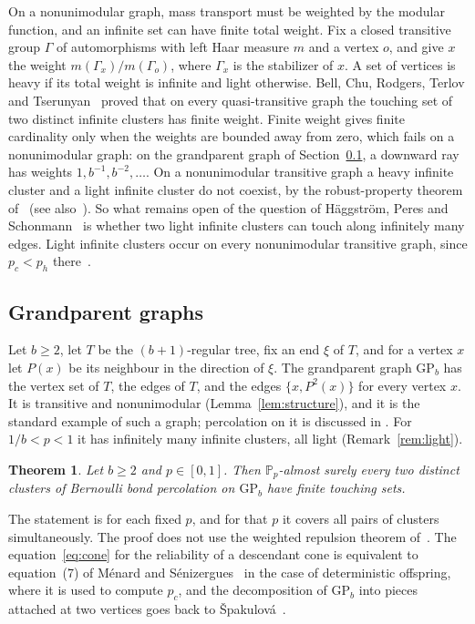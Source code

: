 \documentclass[11pt]{amsart}
\newtheorem{theorem}{Theorem}[section]
\theoremstyle{remark}
\newcommand{\PP}{\mathbb{P}}
\newcommand{\GP}{\mathrm{GP}_b}
\begin{document}
On a nonunimodular graph, mass transport must be weighted by the modular function, and an infinite set can have finite
total weight. Fix a closed transitive group $\Gamma$ of automorphisms with left Haar measure $m$ and a vertex $o$, and
give $x$ the weight $m(\Gamma_x)/m(\Gamma_o)$, where $\Gamma_x$ is the stabilizer of $x$. A set of vertices is heavy if
its total weight is infinite and light otherwise. Bell, Chu, Rodgers, Terlov and Tserunyan~\cite[Theorem~1.2]{BCRTT}
proved that on every quasi-transitive graph the touching set of two distinct infinite clusters has finite weight. Finite
weight gives finite cardinality only when the weights are bounded away from zero, which fails on a nonunimodular graph:
on the grandparent graph of Section~\ref{sec:gp}, a downward ray has weights $1,b^{-1},b^{-2},\dots$. On a nonunimodular
transitive graph a heavy infinite cluster and a light infinite cluster do not coexist, by the robust-property theorem
of~\cite[Theorem~4.1.6]{HPS99} (see also~\cite{Tang19}). So what remains open of the question of Häggström, Peres and
Schonmann~\cite[Question~1.1]{BCRTT} is whether two light infinite clusters can touch along infinitely many edges. Light infinite clusters occur on every
nonunimodular transitive graph, since $p_c<p_h$ there~\cite{Hut20}.

\subsection{Grandparent graphs}\label{sec:gp}
Let $b\ge2$, let $T$ be the $(b+1)$-regular tree, fix an end $\xi$ of $T$, and for a vertex $x$ let $P(x)$ be its
neighbour in the direction of $\xi$. The grandparent graph $\GP$ has the vertex set of $T$, the edges of $T$, and the
edges $\{x,P^2(x)\}$ for every vertex $x$. It is transitive and nonunimodular (Lemma~\ref{lem:structure}), and it is the
standard example of such a graph; percolation on it is discussed in \cite{HPS99,Tim06b,Spa09,MS26}. For $1/b<p<1$ it has
infinitely many infinite clusters, all light (Remark~\ref{rem:light}).

\begin{theorem}\label{thm:main}
Let $b\ge2$ and $p\in[0,1]$. Then $\PP_p$-almost surely every two distinct clusters of Bernoulli bond percolation on $\GP$
have finite touching sets.
\end{theorem}

The statement is for each fixed $p$, and for that $p$ it covers all pairs of clusters simultaneously. The proof does not
use the weighted repulsion theorem of~\cite{BCRTT}. The equation~\eqref{eq:cone} for the reliability of a descendant cone
is equivalent to equation~(7) of Ménard and Sénizergues~\cite{MS26} in the case of deterministic offspring, where it is
used to compute $p_c$, and the decomposition of $\GP$ into pieces attached at two vertices goes back to
Špakulová~\cite[Section~5.3]{Spa09}.
\end{document}
